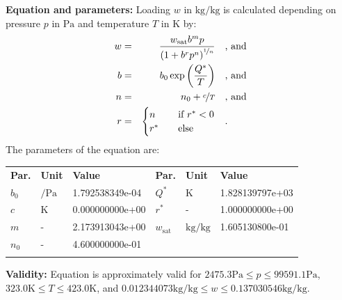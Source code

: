 \textbf{Equation and parameters:}
\newline
%
Loading $w$ in $\si{\kilogram\per\kilogram}$ is calculated depending on pressure $p$ in $\si{\pascal}$ and temperature $T$ in $\si{\kelvin}$ by:
%
\begin{equation*}
\begin{split}
w &=& \frac{w_\mathrm{sat} b^{m} p}{\left( 1 + b^{r} p^{n} \right)^{\nicefrac{1}{n}}} & \quad\text{, and} \\
b &=& b_0 \exp\left( \frac{Q^{*}}{T} \right) & \quad\text{, and} \\
n &=& n_0 + \nicefrac{c}{T} & \quad\text{, and} \\
r &=& \begin{cases} n & \quad \text{if } r^{*} < 0 \\ r^{*}  & \quad \text{else} \end{cases} & \quad\text{.}
\end{split}
\end{equation*}
%
The parameters of the equation are:
%
\begin{longtable}[l]{lll|lll}
\toprule
\addlinespace
\textbf{Par.} & \textbf{Unit} & \textbf{Value} &	\textbf{Par.} & \textbf{Unit} & \textbf{Value} \\
\addlinespace
\midrule
\endhead

\bottomrule
\endfoot
\bottomrule
\endlastfoot
\addlinespace

$b_0$ & $\si{\per\pascal}$ & 1.792538349e-04 & $Q^{*}$ & $\si{\kelvin}$ & 1.828139797e+03 \\
$c$ & $\si{\kelvin}$ & 0.000000000e+00 & $r^{*}$ & - & 1.000000000e+00 \\
$m$ & - & 2.173913043e+00 & $w_\mathrm{sat}$ & $\si{\kilogram\per\kilogram}$ & 1.605130800e-01 \\
$n_0$ & - & 4.600000000e-01 & & & \\

\addlinespace\end{longtable}

\textbf{Validity:}
\newline
Equation is approximately valid for $2475.3 \si{\pascal} \leq p \leq 99591.1 \si{\pascal}$,  $323.0 \si{\kelvin} \leq T \leq 423.0 \si{\kelvin}$, and $0.012344073 \si{\kilogram\per\kilogram} \leq w \leq 0.137030546 \si{\kilogram\per\kilogram}$.
\newline

